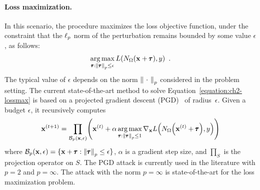 \paragraph{Loss maximization.}
In this scenario, the procedure maximizes the loss objective function, under the constraint that the $\ell_p $ norm of the perturbation remains bounded by some value $\epsilon$, as follows:  
\begin{equation}
  \operatorname*{arg\,max}_{\pmb{\tau}:\norm{\pmb{\tau}}_p \leq \epsilon} L(N_\Omega(\mathbf{x} + \pmb{\tau}), y) \enspace.
  \label{equation:ch2-lossmax}
\end{equation}
The typical value of $\epsilon$ depends on the norm $\norm{\ \cdot\ }_p$ considered in the problem setting.
The current state-of-the-art method to solve Equation~\ref{equation:ch2-lossmax} is based on a projected gradient descent (PGD)~\cite{madry2018towards} of radius~$\epsilon$.
Given a budget $\epsilon$, it recursively computes
\begin{equation}
  \xvec^{(t+1)} = \prod_{\mathcal{B}_p(\xvec,\epsilon)}\left(\xvec^{(t)}
    + \alpha \argmax_{\adv: \norm{\adv}_p \leq 1} \nabla_\xvec L\left( N_\Omega \left(\xvec^{(t)} + \adv \right), y \right)
\right)
  \label{equation:ch2-projectionPGD}
\end{equation}
where $\mathcal{B}_p(\mathbf{x},\epsilon) = \{ \mathbf{x} + \pmb{\tau}:\norm{\pmb{\tau}}_p \leq \epsilon\}$, $\alpha$ is a gradient step size, and $\prod_S$ is the projection operator on $S$.
The PGD attack is currently used in the literature with $p=2$ and $p=\infty$.
The attack with the norm $p=\infty$ is state-of-the-art for the loss maximization problem. 

